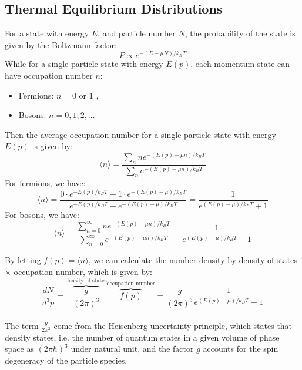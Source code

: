 \clearpage
\subsection{Thermal Equilibrium Distributions}
\begin{foundation}
    For a state with energy $E$, and particle number $N$, the probability of the state is given by the Boltzmann factor:
    \[
        P \propto e^{-(E - \mu N)/k_B T}
    \]
    While for a single-particle state with energy $E(p)$, each momentum state can have occupation number $n$:
    \begin{itemize}
        \item Fermions: $n = 0 \text{ or } 1$ ,
        \item Bosons: $n = 0, 1, 2, \ldots$
    \end{itemize}

    Then the average occupation number for a single-particle state with energy $E(p)$ is given by:
    \[
        \langle n \rangle = \frac{\sum_n n e^{-(E(p) - \mu n)/k_B T}}{\sum_n e^{-(E(p) - \mu n)/k_B T}}
    \]
    For fermions, we have:
    \[
        \langle n \rangle = \frac{0 \cdot e^{-E(p)/k_B T} + 1 \cdot e^{-(E(p) - \mu)/k_B T}}{e^{-E(p)/k_B T} + e^{-(E(p) - \mu)/k_B T}} = \frac{1}{e^{(E(p) - \mu)/k_B T} + 1}
    \]
    For bosons, we have:
    \[
        \langle n \rangle = \frac{\sum_{n=0}^\infty n e^{-(E(p) - \mu n)/k_B T}}{\sum_{n=0}^\infty e^{-(E(p) - \mu n)/k_B T}} = \frac{1}{e^{(E(p) - \mu)/k_B T} - 1}
    \]

    By letting $f(p) = \langle n \rangle$, we can calculate the number density by density of states $\times$ occupation number, which is given by:
    \[
        \frac{dN}{d^3p} = \overbrace{\frac{g}{(2\pi)^3}}^{\text{density of states}} \overbrace{f(p)}^{\text{occupation number}} = \frac{g}{(2\pi)^3} \frac{1}{e^{(E(p) - \mu)/k_B T} \pm 1}
    \] \\

    The term $\frac{g}{2\pi^2}$ come from the Heisenberg uncertainty principle, which states that density states, i.e. the number of quantum states in a given volume of phase space as $(2\pi \hbar)^3$ under natural unit, and the factor $g$ accounts for the spin degeneracy of the particle species.
\end{foundation}

